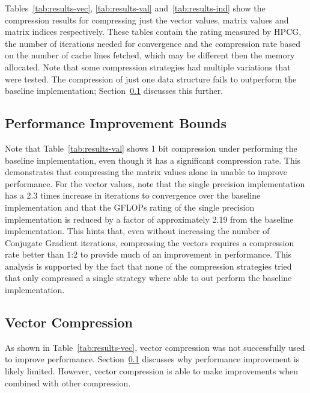 
Tables~\ref{tab:results-vec}, \ref{tab:results-val} and~\ref{tab:results-ind} show the compression results for compressing just the vector values, matrix values and matrix indices respectively.
These tables contain the rating measured by HPCG, the number of iterations needed for convergence and the compression rate based on the number of cache lines fetched, which may be different then the memory allocated.
Note that some compression strategies had multiple variations that were tested.
The compression of just one data structure fails to outperform the baseline implementation; Section~\ref{sec:results-bounds} discusses this further.






\subsection{Performance Improvement Bounds}
\label{sec:results-bounds}
Note that Table~\ref{tab:results-val} shows 1 bit compression under performing the baseline implementation, even though it has a significant compression rate.
This demonstrates that compressing the matrix values alone in unable to improve performance.
For the vector values, note that the single precision implementation has a 2.3 times increase in iterations to convergence over the baseline implementation and that the GFLOPs rating of the single precision implementation is reduced by a factor of approximately 2.19 from the baseline implementation.
This hints that, even without increasing the number of Conjugate Gradient iterations, compressing the vectors requires a compression rate better than 1:2 to provide much of an improvement in performance.
This analysis is supported by the fact that none of the compression strategies tried that only compressed a single strategy where able to out perform the baseline implementation.

\subsection{Vector Compression}
As shown in Table~\ref{tab:results-vec}, vector compression was not successfully used to improve performance.
Section~\ref{sec:results-bounds} discusses why performance improvement is likely limited.
However, vector compression is able to make improvements when combined with other compression.

